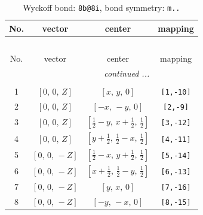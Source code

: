 \documentclass[fleqn,8pt]{jsarticle}
\begin{document}
\begin{longtable}{cccc}
\caption{Wyckoff bond: {\tt 8b@8i}, bond symmetry: {\tt m..}}
 \\
 \hline \hline
No. & vector & center & mapping \\ \hline \endfirsthead

\multicolumn{3}{l}{\tablename\ \thetable{}} \\
 \hline \hline
No. & vector & center & mapping \\ \hline \endhead

 \hline \hline
\multicolumn{3}{r}{\footnotesize\it continued ...} \\ \endfoot

 \hline \hline
\multicolumn{3}{r}{} \\ \endlastfoot

1 & $\left[ 0,\, 0,\, Z \right]$ & $\left[ x,\, y,\, 0 \right]$ & {\tt [1,-10]} \\ \hline
2 & $\left[ 0,\, 0,\, Z \right]$ & $\left[ - x,\, - y,\, 0 \right]$ & {\tt [2,-9]} \\ \hline
3 & $\left[ 0,\, 0,\, Z \right]$ & $\left[ \frac{1}{2} - y,\, x + \frac{1}{2},\, \frac{1}{2} \right]$ & {\tt [3,-12]} \\ \hline
4 & $\left[ 0,\, 0,\, Z \right]$ & $\left[ y + \frac{1}{2},\, \frac{1}{2} - x,\, \frac{1}{2} \right]$ & {\tt [4,-11]} \\ \hline
5 & $\left[ 0,\, 0,\, - Z \right]$ & $\left[ \frac{1}{2} - x,\, y + \frac{1}{2},\, \frac{1}{2} \right]$ & {\tt [5,-14]} \\ \hline
6 & $\left[ 0,\, 0,\, - Z \right]$ & $\left[ x + \frac{1}{2},\, \frac{1}{2} - y,\, \frac{1}{2} \right]$ & {\tt [6,-13]} \\ \hline
7 & $\left[ 0,\, 0,\, - Z \right]$ & $\left[ y,\, x,\, 0 \right]$ & {\tt [7,-16]} \\ \hline
8 & $\left[ 0,\, 0,\, - Z \right]$ & $\left[ - y,\, - x,\, 0 \right]$ & {\tt [8,-15]} \\
\end{longtable}
\renewcommand{\arraystretch}{1.2}
\end{document}
